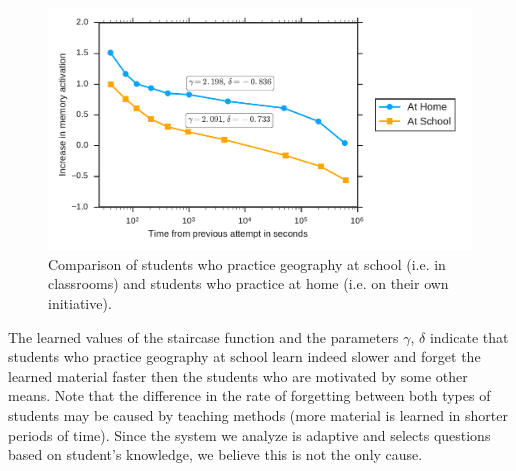 \begin{figure}[htbp]
  \centering
  \includegraphics[width=\textwidth]{img/at-home-vs-at-school}
  \caption{Comparison of students who practice geography at school (i.e. in classrooms) and students who practice at home (i.e. on their own initiative).}
  \label{fig:at-home-vs-at-school}
\end{figure}

The learned values of the staircase function and the parameters $\gamma$, $\delta$ indicate that students who practice geography at school learn indeed slower and forget the learned material faster then the students who are motivated by some other means. Note that the difference in the rate of forgetting between both types of students may be caused by teaching methods (more material is learned in shorter periods of time). Since the system we analyze is adaptive and selects questions based on student's knowledge, we believe this is not the only cause.
